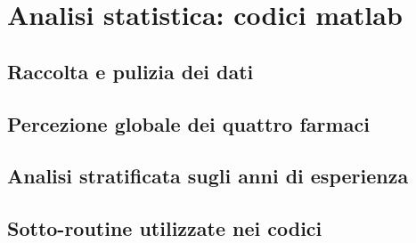 \chapter{Analisi statistica: codici matlab}

\section{Raccolta e pulizia dei dati}
\label{code:wrangling}


\section{Percezione globale dei quattro farmaci}
\label{code:quality-global}


\section{Analisi stratificata sugli anni di esperienza}
\label{code:quality-strati}


\newpage

\section{Sotto-routine utilizzate nei codici}
\label{code:subroutines}

